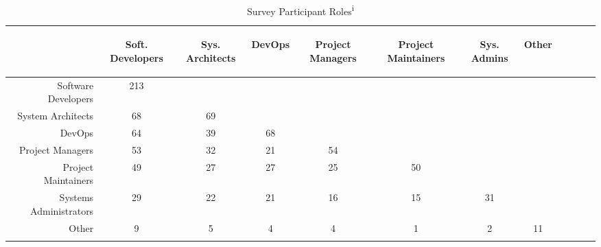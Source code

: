 \begin{table}[!]
\renewcommand{\arraystretch}{1.3}
\caption{Survey Participant Roles\textsuperscript{i}}
\label{survey_roles}
\centering
\begin{tabularx}{0.45\textwidth}{@{}r|*{10}{C}c@{}}
\toprule
\addlinespace[5.4em]
	& \begin{rotate}{45} Soft. Developers \end{rotate} 
	& \begin{rotate}{45} Sys. Architects \end{rotate} 
	& \begin{rotate}{45} DevOps \end{rotate} 
	& \begin{rotate}{45} Project Managers \end{rotate}
	& \begin{rotate}{45} Project Maintainers \end{rotate}
	& \begin{rotate}{45} Sys. Admins \end{rotate}
	& \begin{rotate}{45} Other \end{rotate}\\
\midrule
	Software Developers & 213 & & & & & & \\
	System Architects & 68 & 69 & & & & & \\
	DevOps & 64 & 39 & 68 & & & & \\
	Project Managers & 53 & 32 & 21 & 54 & & & \\
	Project Maintainers & 49 & 27 & 27 & 25 & 50 & & \\
	Systems Administrators & 29 & 22 & 21 & 16 & 15 & 31 & \\
	Other & 9 & 5 & 4 & 4 & 1 & 2 & 11 \\
\bottomrule
\end{tabularx}
\end{table}

